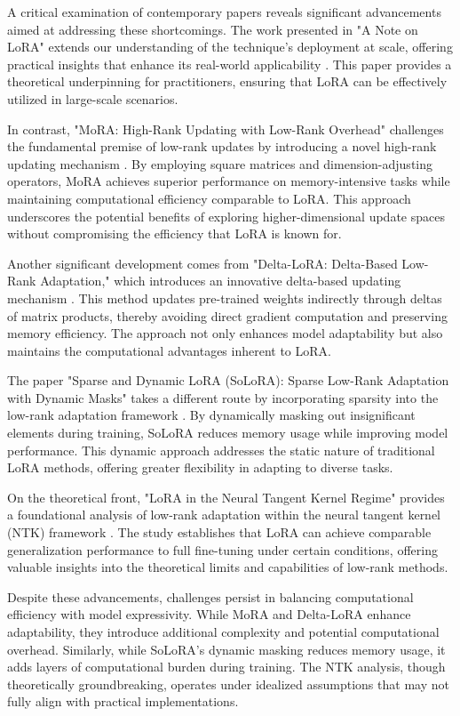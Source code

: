 \documentclass[conference]{IEEEtran}
\begin{document}
A critical examination of contemporary papers reveals significant advancements aimed at addressing these shortcomings. The work presented in "A Note on LoRA" extends our understanding of the technique's deployment at scale, offering practical insights that enhance its real-world applicability \cite{a1}. This paper provides a theoretical underpinning for practitioners, ensuring that LoRA can be effectively utilized in large-scale scenarios.

In contrast, "MoRA: High-Rank Updating with Low-Rank Overhead" challenges the fundamental premise of low-rank updates by introducing a novel high-rank updating mechanism \cite{b2}. By employing square matrices and dimension-adjusting operators, MoRA achieves superior performance on memory-intensive tasks while maintaining computational efficiency comparable to LoRA. This approach underscores the potential benefits of exploring higher-dimensional update spaces without compromising the efficiency that LoRA is known for.

Another significant development comes from "Delta-LoRA: Delta-Based Low-Rank Adaptation," which introduces an innovative delta-based updating mechanism \cite{c3}. This method updates pre-trained weights indirectly through deltas of matrix products, thereby avoiding direct gradient computation and preserving memory efficiency. The approach not only enhances model adaptability but also maintains the computational advantages inherent to LoRA.

The paper "Sparse and Dynamic LoRA (SoLoRA): Sparse Low-Rank Adaptation with Dynamic Masks" takes a different route by incorporating sparsity into the low-rank adaptation framework \cite{d4}. By dynamically masking out insignificant elements during training, SoLoRA reduces memory usage while improving model performance. This dynamic approach addresses the static nature of traditional LoRA methods, offering greater flexibility in adapting to diverse tasks.

On the theoretical front, "LoRA in the Neural Tangent Kernel Regime" provides a foundational analysis of low-rank adaptation within the neural tangent kernel (NTK) framework \cite{e5}. The study establishes that LoRA can achieve comparable generalization performance to full fine-tuning under certain conditions, offering valuable insights into the theoretical limits and capabilities of low-rank methods.

Despite these advancements, challenges persist in balancing computational efficiency with model expressivity. While MoRA and Delta-LoRA enhance adaptability, they introduce additional complexity and potential computational overhead. Similarly, while SoLoRA's dynamic masking reduces memory usage, it adds layers of computational burden during training. The NTK analysis, though theoretically groundbreaking, operates under idealized assumptions that may not fully align with practical implementations.
\end{document}
